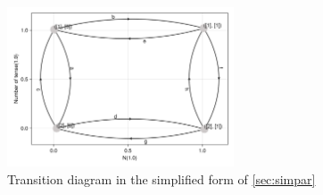\documentclass[11pt]{article}
\begin{document}
\begin{figure}[H]
    \centering
    \includegraphics[width=0.6\textwidth]{../../plots/symalph_B=1_C=2_N=1_version=2.5.png}
    \caption{
        Transition diagram in the simplified form of \cref{sec:simpar}
    }\label{fig:N1symalph}
\end{figure}
\end{document}
